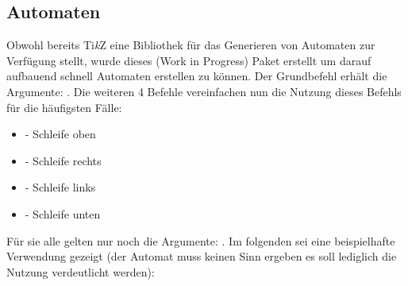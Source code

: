 \subsection{Automaten }
{\centering {}\vspace*{0.5\baselineskip}\par}
Obwohl bereits Ti\textit{k}Z eine Bibliothek für das Generieren von Automaten zur Verfügung stellt, wurde dieses (Work in Progress) Paket erstellt um darauf aufbauend schnell Automaten erstellen zu können. Der Grundbefehl  erhält die Argumente: . Die weiteren 4 Befehle vereinfachen nun die Nutzung dieses Befehls für die häufigsten Fälle:\marginpar{}\marginpar{\vspace*{-.25\baselineskip}}%
\begin{itemize}[label=$\diamond$]\narrowitems
    \item {} - Schleife oben
    \item {} - Schleife rechts
    \item {} - Schleife links
    \item {} - Schleife unten 
\end{itemize}
Für sie alle gelten nur noch die Argumente: .
Im folgenden sei eine beispielhafte Verwendung gezeigt (der Automat muss keinen Sinn ergeben es soll lediglich die Nutzung verdeutlicht werden):

